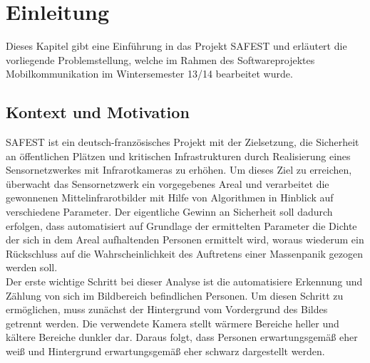 \section{Einleitung}
\label{chap:einleitung}

Dieses Kapitel gibt eine Einführung in das Projekt SAFEST\cite{safest} und erläutert die vorliegende Problemstellung, welche im Rahmen des Softwareprojektes Mobilkommunikation im Wintersemester 13/14 bearbeitet wurde.


\subsection{Kontext und Motivation}
\label{sec:motivation}

SAFEST\cite{safest} ist ein deutsch-französisches Projekt mit der Zielsetzung, die Sicherheit an öffentlichen Plätzen und kritischen Infrastrukturen durch Realisierung eines Sensornetzwerkes mit Infrarotkameras zu erhöhen.
 Um dieses Ziel zu erreichen, überwacht das Sensornetzwerk ein vorgegebenes Areal und verarbeitet die gewonnenen Mittelinfrarotbilder mit Hilfe von Algorithmen in Hinblick auf verschiedene Parameter.
 Der eigentliche Gewinn an Sicherheit soll dadurch erfolgen, dass automatisiert auf Grundlage der ermittelten Parameter die Dichte der sich in dem Areal aufhaltenden Personen ermittelt wird, woraus wiederum ein Rückschluss auf die Wahrscheinlichkeit des Auftretens einer Massenpanik gezogen werden soll.\\
Der erste wichtige Schritt bei dieser Analyse ist die automatisiere Erkennung und Zählung von sich im Bildbereich befindlichen Personen.
 Um diesen Schritt zu ermöglichen, muss zunächst der Hintergrund vom Vordergrund des Bildes getrennt werden.
Die verwendete Kamera stellt wärmere Bereiche heller und kältere Bereiche dunkler dar. Daraus folgt, dass Personen erwartungsgemäß eher weiß und Hintergrund erwartungsgemäß eher schwarz dargestellt werden.
